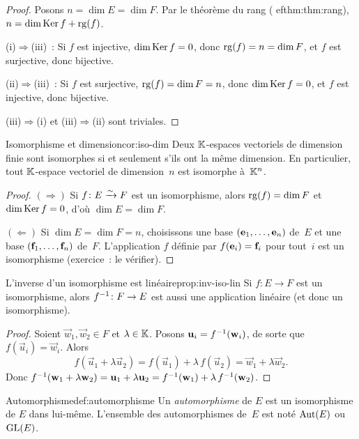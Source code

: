 \begin{proof}
  Posons $n=\dim E=\dim F$. Par le théorème du rang
  (
ef{thm:thm:rang}), $n=\dim\operatorname{Ker} f+\operatorname{rg}(f)$.

  (i)$\Rightarrow$(iii)~: Si $f$ est injective, $\dim\operatorname{Ker} f=0$, donc
  $\operatorname{rg}(f)=n=\dim F$, et $f$ est surjective, donc bijective.

  (ii)$\Rightarrow$(iii)~: Si $f$ est surjective, $\operatorname{rg}(f)=\dim F=n$,
  donc $\dim\operatorname{Ker} f=0$, et $f$ est injective, donc bijective.

  (iii)$\Rightarrow$(i) et (iii)$\Rightarrow$(ii) sont triviales.
\end{proof}

\begin{corollary}{Isomorphisme et dimension}{cor:iso-dim}
  Deux ${\mathbb{K}}$-espaces vectoriels de dimension finie sont isomorphes si et
  seulement s'ils ont la même dimension. En particulier, tout ${\mathbb{K}}$-espace
  vectoriel de dimension~$n$ est isomorphe à~${\mathbb{K}}^n$.
\end{corollary}

\begin{proof}
  $(\Rightarrow)$ Si $f\colon E\xrightarrow{\sim} F$ est un isomorphisme, alors
  $\operatorname{rg}(f)=\dim F$ et $\dim\operatorname{Ker} f=0$, d'où $\dim E=\dim F$.

  $(\Leftarrow)$ Si $\dim E=\dim F=n$, choisissons une base
  $(\mathbf{e}_{1},\ldots,\mathbf{e}_{n})$ de~$E$ et une base
  $(\mathbf{f}_{1},\ldots,\mathbf{f}_{n})$ de~$F$. L'application $f$ définie par
  $f(\mathbf{e}_{i})=\mathbf{f}_{i}$ pour tout~$i$ est un isomorphisme (exercice~: le
  vérifier).
\end{proof}

\begin{proposition}{L'inverse d'un isomorphisme est linéaire}{prop:inv-iso-lin}
  Si $f\colon E\to F$ est un isomorphisme, alors ${f}^{-1}\colon F\to E$
  est aussi une application linéaire (et donc un isomorphisme).
\end{proposition}

\begin{proof}
  Soient $\vec{w}_1,\vec{w}_2\in F$ et $\lambda\in{\mathbb{K}}$. Posons
  $\mathbf{u}_i={f}^{-1}(\mathbf{w}_i)$, de sorte que $f(\vec{u}_i)=\vec{w}_i$.
  Alors
  \[
    f(\vec{u}_1+\lambda\vec{u}_2)
    =f(\vec{u}_1)+\lambda\,f(\vec{u}_2)
    =\vec{w}_1+\lambda\vec{w}_2.
  \]
  Donc ${f}^{-1}(\mathbf{w}_1+\lambda\mathbf{w}_2)
  =\mathbf{u}_1+\lambda\mathbf{u}_2
  ={f}^{-1}(\mathbf{w}_1)+\lambda\,{f}^{-1}(\mathbf{w}_2)$.
\end{proof}

\begin{definition}{Automorphisme}{def:automorphisme}
  Un \emph{automorphisme} de $E$ est un isomorphisme
  de $E$ dans lui-même. L'ensemble des automorphismes de~$E$ est noté
  $\operatorname{Aut}(E)$ ou $\operatorname{GL}(E)$.
\end{definition}

